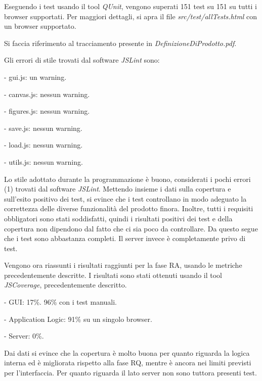 Eseguendo i test usando il tool \textit{QUnit}, vengono superati 151 test su 151 su tutti i browser supportati. Per maggiori dettagli, si apra il file \textit{src/test/allTests.html} con un browser supportato.

Si faccia riferimento al tracciamento presente in \textit{DefinizioneDiProdotto.pdf}.

Gli errori di stile trovati dal software \textit{JSLint} sono:
\begin{elencopuntato}[\subsubsecindent]
\item[-] gui.js: un warning.
\item[-] canvas.js: nessun warning.
\item[-] figures.js: nessun warning.
\item[-] save.js: nessun warning.
\item[-] load.js: nessun warning.
\item[-] utils.js: nessun warning.
\end{elencopuntato}

 Lo stile adottato durante la programmazione \`e buono, considerati i pochi errori (1) trovati dal software \textit{JSLint}. Mettendo insieme i dati sulla copertura e sull'esito positivo dei test, si evince che i test controllano in modo adeguato la correttezza delle diverse funzionalit\`a del prodotto finora. Inoltre, tutti i requisiti obbligatori sono stati soddisfatti, quindi i risultati positivi dei test e della copertura non dipendono dal fatto che ci sia poco da controllare. Da questo segue che i test sono abbastanza completi. Il server invece \`e completamente privo di test. 

Vengono ora riassunti i risultati raggiunti per la fase RA, usando le metriche precedentemente descritte.
I risultati sono stati ottenuti usando il tool \textit{JSCoverage}, precedentemente descritto.
\begin{elencopuntato}[\subsubsecindent]
\item[-] GUI: 17\%. 96\% con i test manuali.
\item[-] Application Logic: 91\% su un singolo browser.
\item[-] Server: 0\%.
\end{elencopuntato}
Dai dati si evince che la copertura \`e molto buona per quanto riguarda la logica interna ed \`e migliorata rispetto alla fase RQ, mentre \`e ancora nei limiti previsti per l'interfaccia. Per quanto riguarda il lato server non sono tuttora presenti test.


